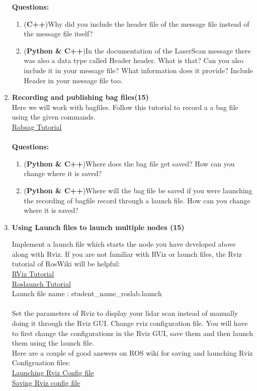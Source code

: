 \documentclass[letta4 paper]{article}
\begin{document}
\begin{enumerate}
    \textbf{Questions: }
    \begin{enumerate}
        \item (\textbf{C++})Why did you include the header file of the message file instead of the message file itself?
        \item (\textbf{Python \& C++})In the documentation of the LaserScan message there was also a data type called Header header. What is that? Can you also include it in your message file? What information does it provide? Include Header in your message file too. 
    \end{enumerate}{}
    \item \textbf{Recording and publishing bag files(15)}\\
    Here we will work with bagfiles. Follow this tutorial to record a a bag file using the given commands. \\
    \href{http://wiki.ros.org/ROS/Tutorials/Recording%20and%20playing%20back%20data}{Robsag Tutorial}\\
    \\
    \textbf{Questions:}\\
    \begin{enumerate}
        \item (\textbf{Python \& C++})Where does the bag file get saved? How can you change where it is saved? 
        \item (\textbf{Python \& C++})Where will the bag file be saved if you were launching the recording of bagfile record through a launch file. How can you change where it is saved?
    \end{enumerate}{}
    
    \item \textbf{Using Launch files to launch multiple nodes (15)}
    
    Implement a launch file which starts the node you have developed above along with Rviz. If you are not familiar with RViz or launch files, the Rviz tutorial of RosWiki will be helpful:  \\
    \href{http://wiki.ros.org/rviz/Tutorials}{RViz Tutorial}\\
    \href{http://wiki.ros.org/roslaunch}{Roslaunch Tutorial}\\
    Launch file name : student\_name\_roslab.launch\\
    \\Set the parameters of Rviz to display your lidar scan instead of manually doing it through the Rviz GUI. Change rviz configuration file. You will have to first change the configurations in the Rviz GUI, save them and then launch them using the launch file.\\
    Here are a couple of good answers on ROS wiki for saving and launching Rviz Configruation files: \\
    \href{https://answers.ros.org/question/287670/run-rviz-with-configuration-file-from-launch-file/}{Launching Rviz Config file}\\
    \href{https://answers.ros.org/question/11845/rviz-configuration-file-format/}{Saving Rviz config file}\\
    

\end{enumerate}
\end{document}
